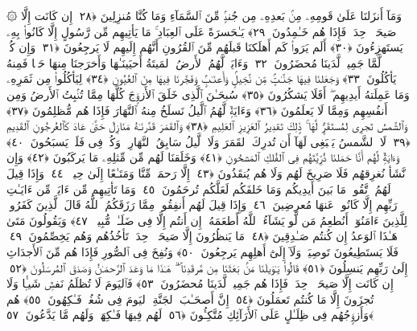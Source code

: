  ۞ وَمَآ أَنزَلنَا عَلَىٰ قَومِهِۦ مِنۢ بَعدِهِۦ مِن جُندٍۢ مِّنَ ٱلسَّمَآءِ وَمَا كُنَّا مُنزِلِينَ ﴿٢٨﴾
 إِن كَانَت إِلَّا صَيحَةًۭ وَٟحِدَةًۭ فَإِذَا هُم خَـٰمِدُونَ ﴿٢٩﴾
 يَـٰحَسرَةً عَلَى ٱلعِبَادِ ۚ مَا يَأتِيهِم مِّن رَّسُولٍ إِلَّا كَانُوا۟ بِهِۦ يَستَهزِءُونَ ﴿٣٠﴾
 أَلَم يَرَوا۟ كَم أَهلَكنَا قَبلَهُم مِّنَ ٱلقُرُونِ أَنَّهُم إِلَيهِم لَا يَرجِعُونَ ﴿٣١﴾
 وَإِن كُلٌّۭ لَّمَّا جَمِيعٌۭ لَّدَينَا مُحضَرُونَ ﴿٣٢﴾
 وَءَايَةٌۭ لَّهُمُ ٱلأَرضُ ٱلمَيتَةُ أَحيَينَـٰهَا وَأَخرَجنَا مِنهَا حَبًّۭا فَمِنهُ يَأكُلُونَ ﴿٣٣﴾
 وَجَعَلنَا فِيهَا جَنَّـٰتٍۢ مِّن نَّخِيلٍۢ وَأَعنَـٰبٍۢ وَفَجَّرنَا فِيهَا مِنَ ٱلعُيُونِ ﴿٣٤﴾
 لِيَأكُلُوا۟ مِن ثَمَرِهِۦ وَمَا عَمِلَتهُ أَيدِيهِم ۖ أَفَلَا يَشكُرُونَ ﴿٣٥﴾
 سُبحَـٰنَ ٱلَّذِى خَلَقَ ٱلأَزوَٟجَ كُلَّهَا مِمَّا تُنۢبِتُ ٱلأَرضُ وَمِن أَنفُسِهِم وَمِمَّا لَا يَعلَمُونَ ﴿٣٦﴾
 وَءَايَةٌۭ لَّهُمُ ٱلَّيلُ نَسلَخُ مِنهُ ٱلنَّهَارَ فَإِذَا هُم مُّظلِمُونَ ﴿٣٧﴾
 وَٱلشَّمسُ تَجرِى لِمُستَقَرٍّۢ لَّهَا ۚ ذَٟلِكَ تَقدِيرُ ٱلعَزِيزِ ٱلعَلِيمِ ﴿٣٨﴾
 وَٱلقَمَرَ قَدَّرنَـٰهُ مَنَازِلَ حَتَّىٰ عَادَ كَٱلعُرجُونِ ٱلقَدِيمِ ﴿٣٩﴾
 لَا ٱلشَّمسُ يَنۢبَغِى لَهَآ أَن تُدرِكَ ٱلقَمَرَ وَلَا ٱلَّيلُ سَابِقُ ٱلنَّهَارِ ۚ وَكُلٌّۭ فِى فَلَكٍۢ يَسبَحُونَ ﴿٤٠﴾
 وَءَايَةٌۭ لَّهُم أَنَّا حَمَلنَا ذُرِّيَّتَهُم فِى ٱلفُلكِ ٱلمَشحُونِ ﴿٤١﴾
 وَخَلَقنَا لَهُم مِّن مِّثلِهِۦ مَا يَركَبُونَ ﴿٤٢﴾
 وَإِن نَّشَأ نُغرِقهُم فَلَا صَرِيخَ لَهُم وَلَا هُم يُنقَذُونَ ﴿٤٣﴾
 إِلَّا رَحمَةًۭ مِّنَّا وَمَتَـٰعًا إِلَىٰ حِينٍۢ ﴿٤٤﴾
 وَإِذَا قِيلَ لَهُمُ ٱتَّقُوا۟ مَا بَينَ أَيدِيكُم وَمَا خَلفَكُم لَعَلَّكُم تُرحَمُونَ ﴿٤٥﴾
 وَمَا تَأتِيهِم مِّن ءَايَةٍۢ مِّن ءَايَـٰتِ رَبِّهِم إِلَّا كَانُوا۟ عَنهَا مُعرِضِينَ ﴿٤٦﴾
 وَإِذَا قِيلَ لَهُم أَنفِقُوا۟ مِمَّا رَزَقَكُمُ ٱللَّهُ قَالَ ٱلَّذِينَ كَفَرُوا۟ لِلَّذِينَ ءَامَنُوٓا۟ أَنُطعِمُ مَن لَّو يَشَآءُ ٱللَّهُ أَطعَمَهُۥٓ إِن أَنتُم إِلَّا فِى ضَلَـٰلٍۢ مُّبِينٍۢ ﴿٤٧﴾
 وَيَقُولُونَ مَتَىٰ هَـٰذَا ٱلوَعدُ إِن كُنتُم صَـٰدِقِينَ ﴿٤٨﴾
 مَا يَنظُرُونَ إِلَّا صَيحَةًۭ وَٟحِدَةًۭ تَأخُذُهُم وَهُم يَخِصِّمُونَ ﴿٤٩﴾
 فَلَا يَستَطِيعُونَ تَوصِيَةًۭ وَلَآ إِلَىٰٓ أَهلِهِم يَرجِعُونَ ﴿٥٠﴾
 وَنُفِخَ فِى ٱلصُّورِ فَإِذَا هُم مِّنَ ٱلأَجدَاثِ إِلَىٰ رَبِّهِم يَنسِلُونَ ﴿٥١﴾
 قَالُوا۟ يَـٰوَيلَنَا مَنۢ بَعَثَنَا مِن مَّرقَدِنَا ۜ ۗ هَـٰذَا مَا وَعَدَ ٱلرَّحمَـٰنُ وَصَدَقَ ٱلمُرسَلُونَ ﴿٥٢﴾
 إِن كَانَت إِلَّا صَيحَةًۭ وَٟحِدَةًۭ فَإِذَا هُم جَمِيعٌۭ لَّدَينَا مُحضَرُونَ ﴿٥٣﴾
 فَٱليَومَ لَا تُظلَمُ نَفسٌۭ شَيـًۭٔا وَلَا تُجزَونَ إِلَّا مَا كُنتُم تَعمَلُونَ ﴿٥٤﴾
 إِنَّ أَصحَـٰبَ ٱلجَنَّةِ ٱليَومَ فِى شُغُلٍۢ فَـٰكِهُونَ ﴿٥٥﴾
 هُم وَأَزوَٟجُهُم فِى ظِلَـٰلٍ عَلَى ٱلأَرَآئِكِ مُتَّكِـُٔونَ ﴿٥٦﴾
 لَهُم فِيهَا فَـٰكِهَةٌۭ وَلَهُم مَّا يَدَّعُونَ ﴿٥٧﴾
